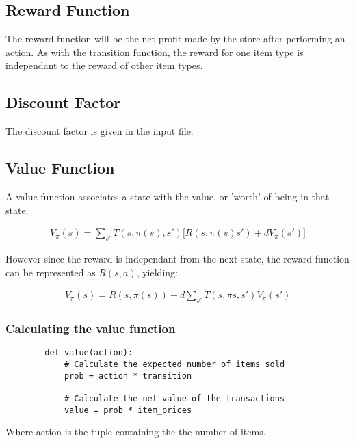 \documentclass[12pt]{article}
\begin{document}
    \subsection{Reward Function}

    The reward function will be the net profit made by the store after performing an action. As with the transition function, the reward for one item type is independant to the reward of other item types.

    \subsection{Discount Factor}

    The discount factor is given in the input file.

    \subsection{Value Function}

    A value function associates a state with the value, or 'worth' of being in that state.

    \begin{align*}
        V_{\pi}(s) = \sum_{s'} T(s, \pi(s), s') \big[ R(s, \pi(s) s') + dV_{\pi}(s') \big]
    \end{align*}

    However since the reward is independant from the next state, the reward function can be represented as $R(s, a)$, yielding:

    \begin{align*}
        V_{\pi}(s) = R(s, \pi(s)) + d\sum_{s'}T(s, \pi{s}, s') V_{\pi}(s')
    \end{align*}

    \subsubsection{Calculating the value function}

    \begin{verbatim}
        def value(action):
            # Calculate the expected number of items sold
            prob = action * transition

            # Calculate the net value of the transactions
            value = prob * item_prices
    \end{verbatim}

    Where action is the tuple containing the the number of items.
\end{document}
